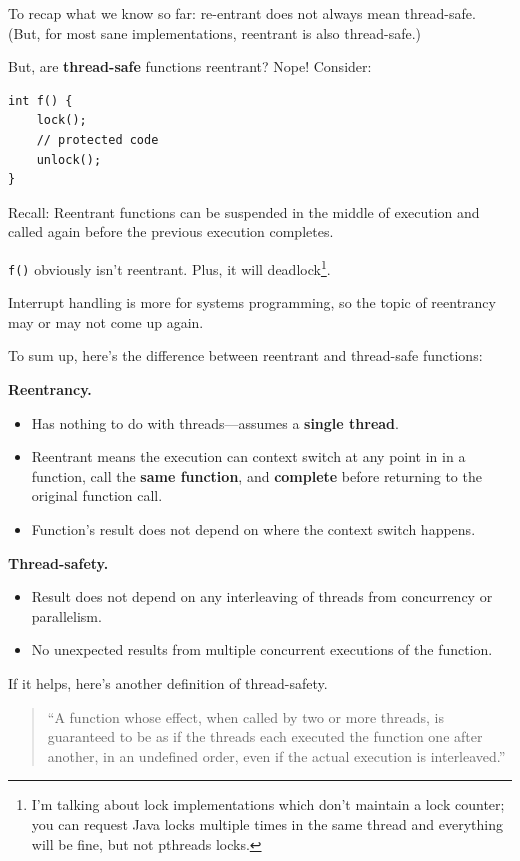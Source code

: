 \documentclass[11pt]{article}
\newenvironment{itemizep}{
 \begin{itemize}
  \setlength{\itemsep}{0pt}
  \setlength{\parsep}{3pt}
  \setlength{\topsep}{3pt}
  \setlength{\partopsep}{0pt}
  \setlength{\leftmargin}{1.5em}
  \setlength{\labelwidth}{1em}
  \setlength{\labelsep}{0.5em} }
 {\end{itemize}}
\begin{document}
To recap what we know so far: re-entrant does not always mean thread-safe. (But, for most sane implementations, reentrant is also thread-safe.)

But, are {\bf thread-safe} functions reentrant?
Nope! Consider:

  \begin{lstlisting}[basicstyle=\scriptsize]
int f() {
    lock();
    // protected code
    unlock();
}
  \end{lstlisting}

Recall:  Reentrant functions can be suspended in the middle of execution
    and called again before the previous execution completes.

{\tt f()} obviously isn't reentrant. Plus, it will deadlock\footnote{I'm talking about lock implementations which don't maintain a lock counter; you can request Java locks multiple times in the same thread and everything will be fine, but not pthreads locks.}.

Interrupt handling is more for systems programming, so the topic of reentrancy may or may not come
up again.

To sum up, here's the difference between reentrant and thread-safe functions:

  {\bf Reentrancy.}
  \begin{itemizep}
    \item Has nothing to do with threads---assumes a {\bf single thread}.
    \item Reentrant means the execution can context switch at any point in
      in a function, call the {\bf same function}, and {\bf complete} before
      returning to the original function call.
    \item Function's result does not depend on where the context switch happens.
  \end{itemizep}

  {\bf Thread-safety.}
  \begin{itemizep}
    \item Result does not depend on any interleaving of threads from
      concurrency or parallelism.
    \item No unexpected results from multiple concurrent executions of the function.
  \end{itemizep}

If it helps, here's another definition of thread-safety.
\begin{quote}
  ``A function whose effect, when called by two or more threads, is guaranteed to
  be as if the threads each executed the function one after another, in an
  undefined order, even if the actual execution is interleaved.''
\end{quote}
\end{document}
